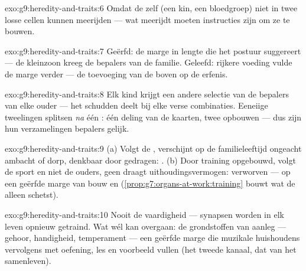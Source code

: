 \begin{solution}{exo:g9:heredity-and-traits:6}
Omdat de  zelf (een kin, een bloedgroep) niet in twee
losse cellen kunnen meerijden --- wat meerijdt moeten
instructies zijn om ze te bouwen.
\end{solution}

\begin{solution}{exo:g9:heredity-and-traits:7}
Geërfd: de marge in lengte die het postuur suggereert --- de
kleinzoon kreeg de bepalers van de familie. Geleefd: rijkere
voeding vulde de marge verder --- de toevoeging van de
 boven op de erfenis.
\end{solution}

\begin{solution}{exo:g9:heredity-and-traits:8}
Elk kind krijgt een andere selectie van de bepalers van elke
ouder --- het schudden deelt bij elke  verse
combinaties. Eeneiige tweelingen splitsen \emph{na} één
: één deling van de kaarten, twee opbouwen --- dus
zijn hun verzamelingen bepalers gelijk.
\end{solution}

\begin{solution}{exo:g9:heredity-and-traits:9}
(a) Volgt de , verschijnt op de familieleeftijd
ongeacht ambacht of dorp, denkbaar door 
gedragen: . (b) Door training opgebouwd, volgt de
sport en niet de ouders, geen  draagt
uithoudingsvermogen: verworven --- op een geërfde marge van
bouw en  (\cref{prop:g7:organs-at-work:training} bouwt wat
de  alleen schetst).
\end{solution}

\begin{solution}{exo:g9:heredity-and-traits:10}
Nooit de vaardigheid --- synapsen worden in elk leven opnieuw
getraind. Wat wél kan overgaan: de grondstoffen van aanleg ---
gehoor, handigheid, temperament --- een geërfde marge die
muzikale huishoudens vervolgens met oefening, les en voorbeeld
vullen (het tweede kanaal, dat van het samenleven).
\end{solution}

